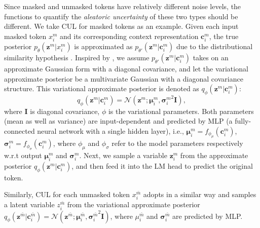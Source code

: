 \documentclass[11pt]{article}
\begin{document}
Since masked and unmasked tokens have relatively different noise levels, the functions to quantify the \textit{aleatoric uncertainty} of these two types should be different.
{We take CUL for masked tokens as an example.}
Given each input masked token $x_i^m$ and its corresponding context representation $\mathbf{c}^m_i$,
the true posterior $p_{\theta}(\mathbf{z}^m | {x}^m_i)$ is approximated as  $p_{\theta'}(\mathbf{z}^m | \mathbf{c}^m_i)$ due to the distributional similarity hypothesis \cite{DBLP:journals/corr/abs-1301-3781}.
Inspired by \citet{DBLP:journals/corr/KingmaW13},
we assume $p_{\theta'}(\mathbf{z}^m | \mathbf{c}^m_i)$ takes on an approximate Gaussian form with a diagonal covariance, 
and let the variational approximate posterior
be a multivariate Gaussian with a diagonal covariance structure.
This variational approximate posterior is denoted as $q_{\phi}(\mathbf{z}^m | \mathbf{c}^m_i)$:
\begin{equation}
q_{\phi}(\mathbf{z}^m | \mathbf{c}^m_i) = \mathcal{N}(\mathbf{z}^m; \boldsymbol{\mu}^m_i, {\boldsymbol{\sigma}^m_i}^2 \mathbf{I}), \label{eq:2}
\end{equation}
where $\mathbf{I}$ is diagonal covariance, $\phi$ is the variational parameters.
Both parameters (mean as well as variance) are input-dependent and  predicted by MLP (a fully-connected neural network with a single hidden layer), i.e., $\boldsymbol{\mu}^m_i = f_{\phi_{\mu}}(\mathbf{c}^m_i)$, $\boldsymbol{\sigma}^m_i = f_{\phi_{\sigma}}(\mathbf{c}^m_i)$, where $\phi_\mu$ and $\phi_\sigma$ refer to the model parameters respectively w.r.t output $\boldsymbol{\mu}^m_i$ and ${\boldsymbol{\sigma}}^m_i$.
Next, we sample a variable $\mathbf{z}_i^m$ from the approximate posterior $q_{\phi}(\mathbf{z}^m | \mathbf{c}^m_i)$, and then feed it into the LM head to predict the original token.

Similarly, CUL for each unmasked token $x^{\bar{m}}_i$ adopts in a similar way and samples a latent variable $z^{\bar{m}}_i$ from the variational approximate posterior $q_{\phi}(\mathbf{z}^{\bar{m}} | \mathbf{c}^{\bar{m}}_i) = \mathcal{N}(\mathbf{z}^{\bar{m}}; \boldsymbol{\mu}^{\bar{m}}_i, {\boldsymbol{\sigma}^{\bar{m}}_i}^2 \mathbf{I})$,  where ${\mu}^{\bar{m}}_i$ and  $\boldsymbol{\sigma}^{\bar{m}}_i$ are predicted by MLP.
\end{document}
